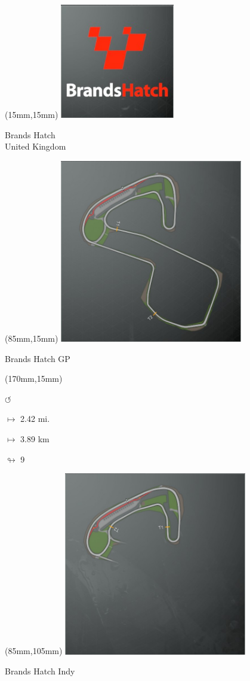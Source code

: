 \begin{textblock*}{60mm}(15mm,15mm)%
\includegraphics[width=50mm]{LG/2015-05-20_00074.png}
\par Brands Hatch\\ United Kingdom
\end{textblock*}
\begin{textblock*}{80mm}(85mm,15mm)%
\includegraphics[width=80mm]{TR/2015-05-20_00007.png}
\centerline{Brands Hatch GP}
\end{textblock*}
\begin{textblock*}{30mm}(170mm,15mm)%
\par \Huge$\circlearrowleft$
\Large
\par$\mapsto$ 2.42 mi.
\par$\mapsto$ 3.89 km
\par$\looparrowright$ 9
\end{textblock*}
\begin{textblock*}{80mm}(85mm,105mm)%
\includegraphics[width=80mm]{TR/2015-05-20_00008.png}
\centerline{Brands Hatch Indy}
\end{textblock*}
